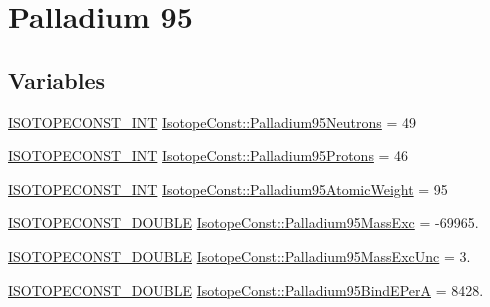 \hypertarget{group___isotope_const-_palladium-_pd95}{}\section{Palladium 95}
\label{group___isotope_const-_palladium-_pd95}
\subsection*{Variables}
\begin{DoxyCompactItemize}
\item 
\mbox{\hyperlink{group___isotope_const-_macros_ga5f18360b3e99483a35c32d789e62621c}{I\+S\+O\+T\+O\+P\+E\+C\+O\+N\+S\+T\+\_\+\+I\+NT}} \mbox{\hyperlink{group___isotope_const-_palladium-_pd95_gaaf8b9ba917e9bd837857ff5aa55ce670}{Isotope\+Const\+::\+Palladium95\+Neutrons}} = 49
\item 
\mbox{\hyperlink{group___isotope_const-_macros_ga5f18360b3e99483a35c32d789e62621c}{I\+S\+O\+T\+O\+P\+E\+C\+O\+N\+S\+T\+\_\+\+I\+NT}} \mbox{\hyperlink{group___isotope_const-_palladium-_pd95_ga4625188db78e4cc0edc276b888cc2b56}{Isotope\+Const\+::\+Palladium95\+Protons}} = 46
\item 
\mbox{\hyperlink{group___isotope_const-_macros_ga5f18360b3e99483a35c32d789e62621c}{I\+S\+O\+T\+O\+P\+E\+C\+O\+N\+S\+T\+\_\+\+I\+NT}} \mbox{\hyperlink{group___isotope_const-_palladium-_pd95_ga178a9e3e446c5b56f8379dc8bcae5c0b}{Isotope\+Const\+::\+Palladium95\+Atomic\+Weight}} = 95
\item 
\mbox{\hyperlink{group___isotope_const-_macros_ga8f45a7272ce02c0b4c65c44636ed719a}{I\+S\+O\+T\+O\+P\+E\+C\+O\+N\+S\+T\+\_\+\+D\+O\+U\+B\+LE}} \mbox{\hyperlink{group___isotope_const-_palladium-_pd95_ga655634a609ae77a1ee6e126be92ca706}{Isotope\+Const\+::\+Palladium95\+Mass\+Exc}} = -\/69965.
\item 
\mbox{\hyperlink{group___isotope_const-_macros_ga8f45a7272ce02c0b4c65c44636ed719a}{I\+S\+O\+T\+O\+P\+E\+C\+O\+N\+S\+T\+\_\+\+D\+O\+U\+B\+LE}} \mbox{\hyperlink{group___isotope_const-_palladium-_pd95_ga0609e24d8743b8181c627e89adc84810}{Isotope\+Const\+::\+Palladium95\+Mass\+Exc\+Unc}} = 3.
\item 
\mbox{\hyperlink{group___isotope_const-_macros_ga8f45a7272ce02c0b4c65c44636ed719a}{I\+S\+O\+T\+O\+P\+E\+C\+O\+N\+S\+T\+\_\+\+D\+O\+U\+B\+LE}} \mbox{\hyperlink{group___isotope_const-_palladium-_pd95_ga33eb0499393939029730f9f0ec4ad3a8}{Isotope\+Const\+::\+Palladium95\+Bind\+E\+PerA}} = 8428.
\item 

\end{DoxyCompactItemize}
